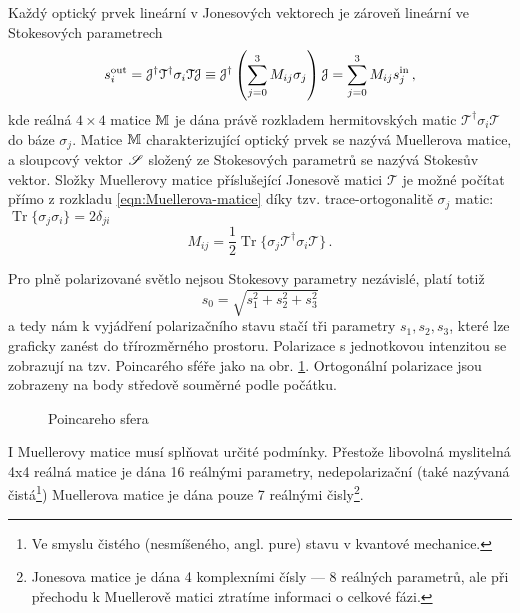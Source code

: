 Každý optický prvek lineární v Jonesových vektorech je zároveň lineární ve Stokesových parametrech
\begin{equation} 
\label{eqn:Muellerova-matice}
    s^\textrm{out}_i=\mathcal{J}^\dagger \mathcal{T}^\dagger \sigma_i \mathcal{T} \mathcal{J}\equiv\mathcal{J}^\dagger \left(\sum_{j=0}^{3} M_{ij} \sigma_j \right) \mathcal{J}
    =\sum_{j=0}^{3} M_{ij} s^\textrm{in}_j \,,
\end{equation}
kde reálná $4\times 4$ matice $\mathbb{M}$ je dána právě rozkladem hermitovských matic $\mathcal{T}^\dagger \sigma_i \mathcal{T}$ do báze $\sigma_j$.
Matice $\mathbb{M}$ charakterizující optický prvek se nazývá Muellerova matice, a sloupcový vektor $\mathscr{S}$ složený ze Stokesových parametrů se nazývá Stokesův vektor.
Složky Muellerovy matice příslušející Jonesově matici $\mathcal{T}$ je možné počítat přímo z rozkladu \eqref{eqn:Muellerova-matice} díky tzv. trace-ortogonalitě $\sigma_j$ matic: $\operatorname{Tr}\lbrace\sigma_j\sigma_i\rbrace=2\delta_{ji}$
\begin{equation} 
\label{e:mueller rozklad}
    M_{ij}=\frac{1}{2}\operatorname{Tr}\lbrace \sigma_j \mathcal{T}^\dagger \sigma_i \mathcal{T} \rbrace \,.
\end{equation}

Pro plně polarizované světlo nejsou Stokesovy parametry nezávislé, platí totiž
\begin{equation} \label{e:norma S}
s_0=\sqrt{s_1^2+s_2^2+s_3^2}
\end{equation}
a tedy nám k vyjádření polarizačního stavu stačí tři parametry $s_1, s_2, s_3$, které lze graficky zanést do třírozměrného prostoru.
Polarizace s jednotkovou intenzitou se zobrazují na tzv. Poincarého sféře jako na obr. \ref{fig:Poincareho-sfera}.
Ortogonální polarizace jsou zobrazeny na body středově souměrné podle počátku.

\begin{figure}[htbp]
    \centering
    \missingfigure
    \caption{Poincareho sfera}
    \label{fig:Poincareho-sfera}
\end{figure}

I Muellerovy matice musí splňovat určité podmínky.
Přestože libovolná myslitelná 4x4 reálná matice je dána 16 reálnými parametry, nedepolarizační (také nazývaná čistá\footnote{Ve smyslu čistého (nesmíšeného, angl. pure) stavu v kvantové mechanice.}) Muellerova matice je dána pouze 7 reálnými čisly\footnote{Jonesova matice je dána 4 komplexními čísly --- 8 reálných parametrů, ale při přechodu k Muellerově matici ztratíme informaci o celkové fázi.}. 

